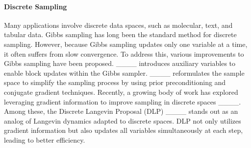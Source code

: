 \paragraph{Discrete Sampling}
Many applications involve discrete data spaces, such as molecular, text, and tabular data. Gibbs sampling has long been the standard method for discrete sampling. However, because Gibbs sampling updates only one variable at a time, it often suffers from slow convergence. To address this, various improvements to Gibbs sampling have been proposed. ____ introduces auxiliary variables to enable block updates within the Gibbs sampler. ____ reformulates the sample space to simplify the sampling process by using prior preconditioning and conjugate gradient techniques.
Recently, a growing body of work has explored leveraging gradient information to improve sampling in discrete spaces ____. Among these, the Discrete Langevin Proposal (DLP) ____ stands out as an analog of Langevin dynamics adapted to discrete spaces. DLP not only utilizes gradient information but also updates all variables simultaneously at each step, leading to better efficiency.